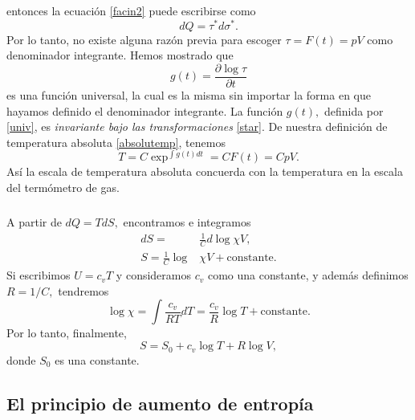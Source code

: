 \documentclass{article}
\theoremstyle{definition} \newtheorem{defi}{Definici\'on}
\theoremstyle{definition} \newtheorem{teo}{Teorema}
\theoremstyle{definition} \newtheorem{cor}{Corolario}
\begin{document}
entonces la ecuaci\'on \eqref{facin2} puede escribirse como
\begin{equation}
dQ=\tau^*d\sigma^*.
\end{equation}
Por lo tanto, no existe alguna raz\'on previa para escoger $\tau=F(t)=pV$ como denominador integrante. Hemos mostrado que
\begin{equation}\label{univ}
g(t)=\frac{\partial \log \tau}{\partial t}
\end{equation}
es una funci\'on universal, la cual es la misma sin importar la forma en que hayamos definido el denominador integrante. La funci\'on $g(t),$ definida por \eqref{univ}, es \emph{invariante bajo las transformaciones} \eqref{star}. De nuestra definici\'on de temperatura absoluta \eqref{absolutemp}, tenemos
\begin{equation}
T=C\exp^{\int g(t)dt}=CF(t)=CpV.
\end{equation}
As\'i la escala de temperatura absoluta concuerda con la temperatura en la escala del term\'ometro de gas.
\subparagraph{}
A partir de $dQ=TdS,$ encontramos e integramos
\begin{align}
dS=&\frac{1}{C}d\log \chi V,\\
S=\frac{1}{C}\log&\chi V+\text{constante}.
\end{align}
Si escribimos $U=c_vT$ y consideramos $c_v$ como una constante, y adem\'as definimos $R=1/C,$ tendremos
\begin{equation}
\log \chi =\int \frac{c_v}{RT}dT=\frac{c_v}{R}\log T+\text{constante}.
\end{equation}
Por lo tanto, finalmente,
\begin{equation}\label{entrofin}
S=S_0+c_v\log T+R\log V,
\end{equation}
donde $S_0$ es una constante.
\subsection{El principio de aumento de entrop\'ia}\label{aumentoentro}
\end{document}
